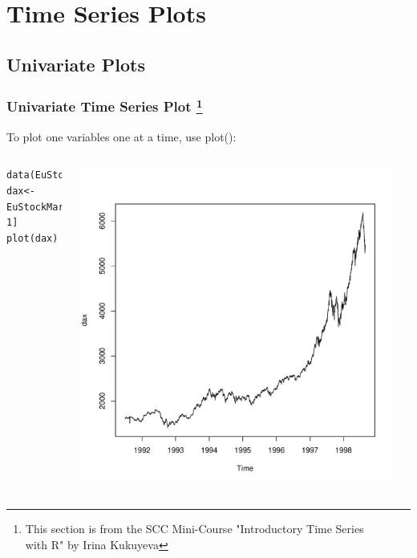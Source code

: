 



\section[TS]{ Time Series Plots}

\subsection{Univariate Plots}

\begin{frame}[fragile]
 \frametitle{Univariate Time Series Plot  \footnote{This section is from the SCC Mini-Course "Introductory Time Series \\ with R" by Irina Kukuyeva}}

To plot one variables one at a time, use \ttfamily plot(): \normalfont 
    \begin{columns}
		\begin{lstlisting}
data(EuStockMarkets)
dax<-EuStockMarkets[, 1]
plot(dax)
		\end{lstlisting}

       \begin{center}
         \includegraphics[width=0.95\textwidth]{images/daxPlot.pdf}
        \end{center}
      \end{columns}

\end{frame}

